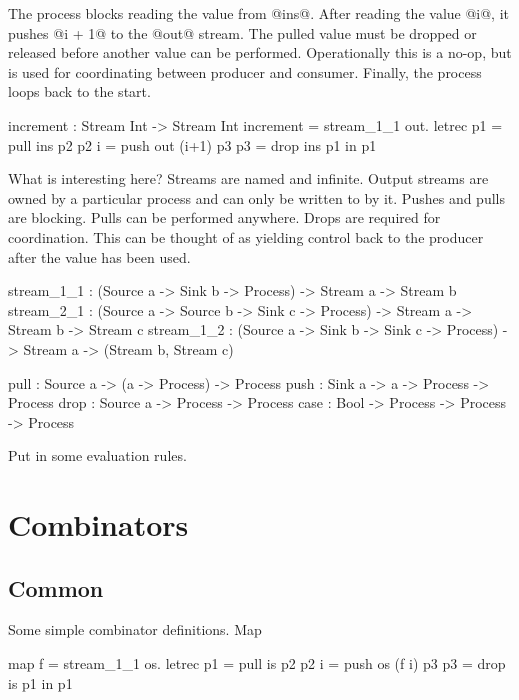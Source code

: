 The process blocks reading the value from @ins@.
After reading the value @i@, it pushes @i + 1@ to the @out@ stream.
The pulled value must be dropped or released before another value can be performed.
Operationally this is a no-op, but is used for coordinating between producer and consumer.
Finally, the process loops back to the start.

\begin{code}
increment : Stream Int -> Stream Int
increment = stream_1_1 \ins out.
  letrec
    p1   = pull ins       p2
    p2 i = push out (i+1) p3
    p3   = drop ins       p1
  in p1
\end{code}

What is interesting here?
Streams are named and infinite.
Output streams are owned by a particular process and can only be written to by it.
Pushes and pulls are blocking.
Pulls can be performed anywhere.
Drops are required for coordination.
This can be thought of as yielding control back to the producer after the value has been used.

\begin{code}
stream_1_1 : (Source a -> Sink b
              -> Process)
          -> Stream a -> Stream b
stream_2_1 : (Source a -> Source b -> Sink c
              -> Process)
          -> Stream a -> Stream b -> Stream c
stream_1_2 : (Source a -> Sink b -> Sink c
              -> Process)
          -> Stream a -> (Stream b, Stream c)

pull : Source a -> (a -> Process) -> Process
push : Sink   a ->  a -> Process  -> Process
drop : Source a ->       Process  -> Process
case : Bool -> Process -> Process -> Process
\end{code}

Put in some evaluation rules.

\section{Combinators}

\subsection{Common}
\label{s:Combinators:Common}

Some simple combinator definitions.
Map 

\begin{code}
map f = stream_1_1 \is os.
  letrec
    p1   = pull is p2
    p2 i = push os (f i) p3
    p3   = drop is p1
  in p1
\end{code}

